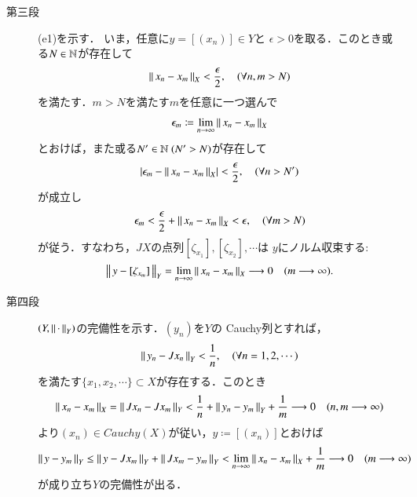 \begin{prf}
\begin{description}
			\item[第三段]
				(e1)を示す．
				いま，任意に$y = [(x_n)] \in Y$と
				$\epsilon > 0$を取る．このとき或る$N \in \mathbb{N}$が存在して
				\begin{align}
					\left\|\, x_n - x_m\, \right\|_{X} < \frac{\epsilon}{2},
					\quad (\forall n,m > N)
				\end{align}
				を満たす．$m > N$を満たす$m$を任意に一つ選んで
				\begin{align}
					\epsilon_m \coloneqq \lim_{n \to \infty} \left\|\, x_n - x_m\, \right\|_{X}
				\end{align}
				とおけば，また或る$N' \in \mathbb{N}\ (N' > N)$が存在して
				\begin{align}
					\left| \epsilon_m - \left\|\, x_n - x_m\, \right\|_{X} \right| < \frac{\epsilon}{2},
					\quad (\forall n > N')
				\end{align}
				が成立し
				\begin{align}
					\epsilon_m < \frac{\epsilon}{2} + \left\|\, x_n - x_m\, \right\|_{X} < \epsilon,
					\quad (\forall m > N)
				\end{align}
				が従う．すなわち，$J X$の点列$[\zeta_{x_1}],[\zeta_{x_2}],\cdots$は
				$y$にノルム収束する:
				\begin{align}
					\left\|\, y - [\zeta_{x_m}]\, \right\|_{Y}
					= \lim_{n \to \infty} \left\|\, x_n - x_m\, \right\|_{X}
					\longrightarrow 0
					\quad (m \longrightarrow \infty).
				\end{align}
				
			\item[第四段]
				$(Y,\left\|\, \cdot\, \right\|_{Y})$の完備性を示す．$(y_n)$を$Y$の
				Cauchy列とすれば，
				\begin{align}
					\left\|\, y_n - J x_n\, \right\|_{Y} < \frac{1}{n},
					\quad (\forall n = 1,2,\cdots)
				\end{align}
				を満たす$\{x_1,x_2,\cdots\} \subset X$が存在する．このとき
				\begin{align}
					\left\|\, x_n - x_m\, \right\|_{X}
					= \left\|\, J x_n - J x_m\, \right\|_{Y}
					< \frac{1}{n} + \left\|\, y_n - y_m\, \right\|_{Y} + \frac{1}{m}
					\longrightarrow 0
					\quad (n,m \longrightarrow \infty)
				\end{align} 
				より$(x_n) \in Cauchy(X)$が従い，$y \coloneqq [(x_n)]$とおけば
				\begin{align}
					\left\|\, y - y_m\, \right\|_{Y}
					\leq \left\|\, y - J x_m\, \right\|_{Y} + \left\|\, J x_m - y_m\, \right\|_{Y}
					< \lim_{n \to \infty} \left\|\, x_n - x_m\, \right\|_{X} + \frac{1}{m}
					\longrightarrow 0
					\quad (m \longrightarrow \infty)
				\end{align}
				が成り立ち$Y$の完備性が出る．
				

\end{description}
\end{prf}
